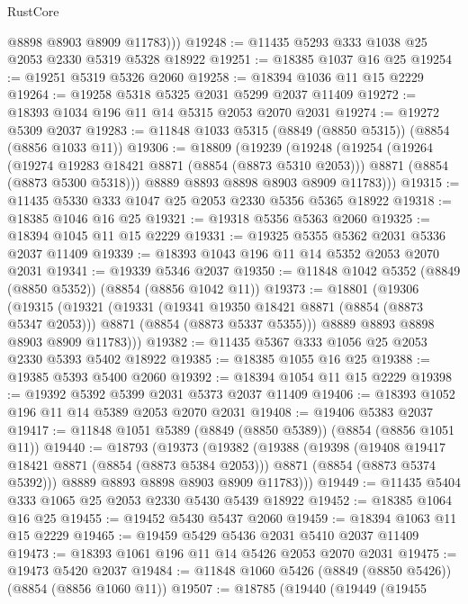 \begin{lexlean}{RustCore}
\begin{coremodule}
          @8898
          @8903
          @8909
          @11783)))
@19248 := @11435 @5293 @333 @1038 @25 @2053 @2330 @5319 @5328 @18922
@19251 := @18385 @1037 @16 @25
@19254 := @19251 @5319 @5326 @2060
@19258 := @18394 @1036 @11 @15 @2229
@19264 := @19258 @5318 @5325 @2031 @5299 @2037 @11409
@19272 := @18393 @1034 @196 @11 @14 @5315 @2053 @2070 @2031
@19274 := @19272 @5309 @2037
@19283 := @11848 @1033 @5315 (@8849 (@8850 @5315)) (@8854 (@8856 @1033 @11))
@19306 := @18809
    (@19239
      (@19248
        (@19254
          (@19264
            (@19274 @19283 @18421 @8871 (@8854 (@8873 @5310 @2053)))
            @8871
            (@8854 (@8873 @5300 @5318)))
          @8889
          @8893
          @8898
          @8903
          @8909
          @11783)))
@19315 := @11435 @5330 @333 @1047 @25 @2053 @2330 @5356 @5365 @18922
@19318 := @18385 @1046 @16 @25
@19321 := @19318 @5356 @5363 @2060
@19325 := @18394 @1045 @11 @15 @2229
@19331 := @19325 @5355 @5362 @2031 @5336 @2037 @11409
@19339 := @18393 @1043 @196 @11 @14 @5352 @2053 @2070 @2031
@19341 := @19339 @5346 @2037
@19350 := @11848 @1042 @5352 (@8849 (@8850 @5352)) (@8854 (@8856 @1042 @11))
@19373 := @18801
    (@19306
      (@19315
        (@19321
          (@19331
            (@19341 @19350 @18421 @8871 (@8854 (@8873 @5347 @2053)))
            @8871
            (@8854 (@8873 @5337 @5355)))
          @8889
          @8893
          @8898
          @8903
          @8909
          @11783)))
@19382 := @11435 @5367 @333 @1056 @25 @2053 @2330 @5393 @5402 @18922
@19385 := @18385 @1055 @16 @25
@19388 := @19385 @5393 @5400 @2060
@19392 := @18394 @1054 @11 @15 @2229
@19398 := @19392 @5392 @5399 @2031 @5373 @2037 @11409
@19406 := @18393 @1052 @196 @11 @14 @5389 @2053 @2070 @2031
@19408 := @19406 @5383 @2037
@19417 := @11848 @1051 @5389 (@8849 (@8850 @5389)) (@8854 (@8856 @1051 @11))
@19440 := @18793
    (@19373
      (@19382
        (@19388
          (@19398
            (@19408 @19417 @18421 @8871 (@8854 (@8873 @5384 @2053)))
            @8871
            (@8854 (@8873 @5374 @5392)))
          @8889
          @8893
          @8898
          @8903
          @8909
          @11783)))
@19449 := @11435 @5404 @333 @1065 @25 @2053 @2330 @5430 @5439 @18922
@19452 := @18385 @1064 @16 @25
@19455 := @19452 @5430 @5437 @2060
@19459 := @18394 @1063 @11 @15 @2229
@19465 := @19459 @5429 @5436 @2031 @5410 @2037 @11409
@19473 := @18393 @1061 @196 @11 @14 @5426 @2053 @2070 @2031
@19475 := @19473 @5420 @2037
@19484 := @11848 @1060 @5426 (@8849 (@8850 @5426)) (@8854 (@8856 @1060 @11))
@19507 := @18785
    (@19440
      (@19449
        (@19455

\end{coremodule}
\end{lexlean}
